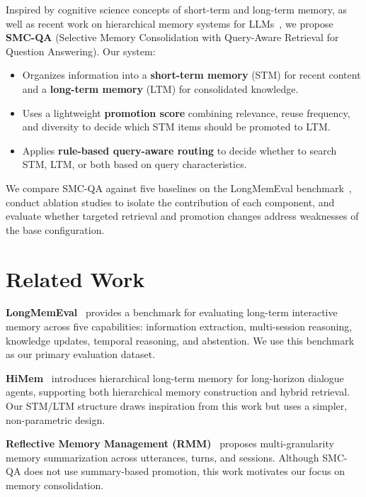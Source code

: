 \documentclass{article}
\begin{document}
Inspired by cognitive science concepts of short-term and long-term memory, as well as recent work on hierarchical memory systems for LLMs~\cite{himem, rmm, lightmem}, we propose \textbf{SMC-QA} (Selective Memory Consolidation with Query-Aware Retrieval for Question Answering). Our system:

\begin{itemize}
    \item Organizes information into a \textbf{short-term memory} (STM) for recent content and a \textbf{long-term memory} (LTM) for consolidated knowledge.
    \item Uses a lightweight \textbf{promotion score} combining relevance, reuse frequency, and diversity to decide which STM items should be promoted to LTM.
    \item Applies \textbf{rule-based query-aware routing} to decide whether to search STM, LTM, or both based on query characteristics.
\end{itemize}

We compare SMC-QA against five baselines on the LongMemEval benchmark~\cite{longmemeval}, conduct ablation studies to isolate the contribution of each component, and evaluate whether targeted retrieval and promotion changes address weaknesses of the base configuration.

\section{Related Work}

\textbf{LongMemEval}~\cite{longmemeval} provides a benchmark for evaluating long-term interactive memory across five capabilities: information extraction, multi-session reasoning, knowledge updates, temporal reasoning, and abstention. We use this benchmark as our primary evaluation dataset.

\textbf{HiMem}~\cite{himem} introduces hierarchical long-term memory for long-horizon dialogue agents, supporting both hierarchical memory construction and hybrid retrieval. Our STM/LTM structure draws inspiration from this work but uses a simpler, non-parametric design.

\textbf{Reflective Memory Management (RMM)}~\cite{rmm} proposes multi-granularity memory summarization across utterances, turns, and sessions. Although SMC-QA does not use summary-based promotion, this work motivates our focus on memory consolidation.
\end{document}
